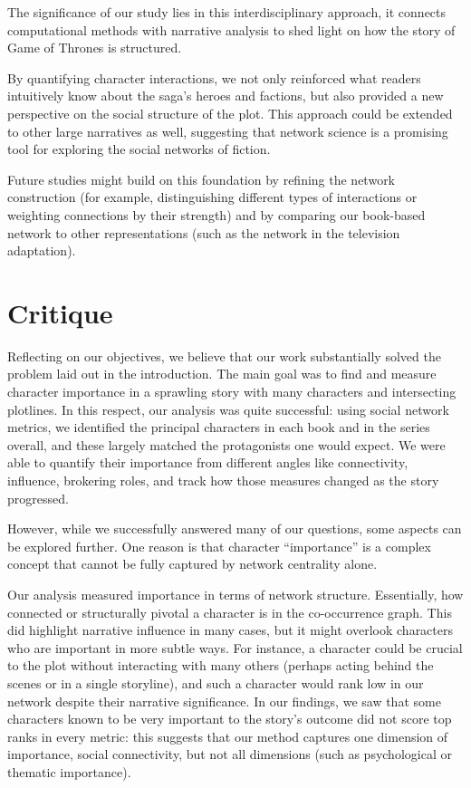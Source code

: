 \documentclass[12pt, a4paper]{article}
\begin{document}
The significance of our study lies in this interdisciplinary approach, 
it connects computational methods with narrative analysis to shed light on how the story of Game of Thrones is structured. 

By quantifying character interactions, we not only reinforced what readers intuitively know about the saga’s heroes and factions, 
but also provided a new perspective on the social structure of the plot. 
This approach could be extended to other large narratives as well, suggesting that network science is a promising tool for exploring the social networks of fiction.
 

Future studies might build on this foundation by refining the network construction 
 (for example, distinguishing different types of interactions or weighting connections by their strength) 
 and by comparing our book-based network to other representations (such as the network in the television adaptation). 


\section{Critique}
Reflecting on our objectives, we believe that our work substantially solved the problem laid out in the introduction. 
The main goal was to find and measure character importance in a sprawling story with many characters and intersecting plotlines. 
In this respect, our analysis was quite successful: using social network metrics, 
we identified the principal characters in each book and in the series overall, 
and these largely matched the protagonists one would expect. We were able to quantify their importance from different angles
like connectivity, influence, brokering roles, and track how those measures changed as the story progressed. 



However, while we successfully answered many of our questions, some aspects can be explored further.
One reason is that character “importance” is a complex concept that cannot be fully captured by network centrality alone. 

Our analysis measured importance in terms of network structure. Essentially, how connected or structurally pivotal a character 
is in the co-occurrence graph. This did highlight narrative influence in many cases, but it might overlook characters who are important in more subtle ways. 
For instance, a character could be crucial to the plot without interacting with many others (perhaps acting behind the scenes or in a single storyline), 
and such a character would rank low in our network despite their narrative significance. In our findings, we saw that some characters known to be very 
important to the story’s outcome did not score top ranks in every metric: this suggests that our method captures one dimension of importance,
social connectivity, but not all dimensions (such as psychological or thematic importance). 
\end{document}
